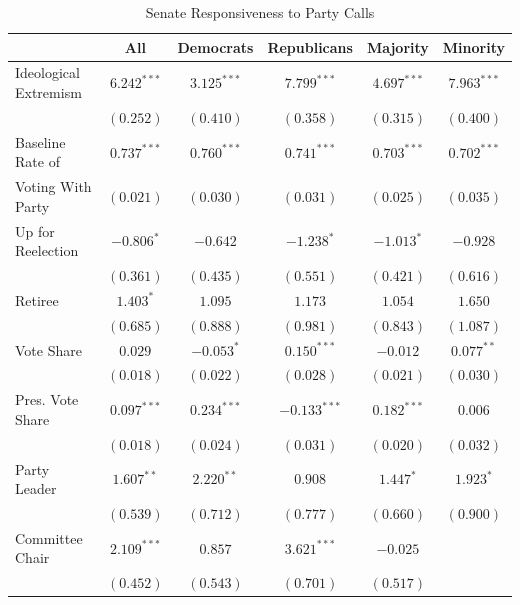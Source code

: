 \documentclass[12pt]{article}
\begin{document}
\begin{table}[H]
\centering
\begin{threeparttable}
\label{tab-senate-models}
\singlespacing
\small
\caption{Senate Responsiveness to Party Calls}
\small
\begin{tabular}{l c c c c c }
\hline
& All & Democrats & Republicans & Majority & Minority \\
\hline
Ideological Extremism & $6.242^{***}$  & $3.125^{***}$ & $7.799^{***}$  & $4.697^{***}$  & $7.963^{***}$ \\
& $(0.252)$      & $(0.410)$     & $(0.358)$      & $(0.315)$      & $(0.400)$     \\
Baseline Rate of               & $0.737^{***}$  & $0.760^{***}$ & $0.741^{***}$  & $0.703^{***}$  & $0.702^{***}$ \\
\hspace{.7em}Voting With Party& $(0.021)$      & $(0.030)$     & $(0.031)$      & $(0.025)$      & $(0.035)$     \\
Up for Reelection    & $-0.806^{*}$   & $-0.642$      & $-1.238^{*}$   & $-1.013^{*}$   & $-0.928$      \\
& $(0.361)$      & $(0.435)$     & $(0.551)$      & $(0.421)$      & $(0.616)$     \\
Retiree                & $1.403^{*}$    & $1.095$       & $1.173$        & $1.054$        & $1.650$       \\
& $(0.685)$      & $(0.888)$     & $(0.981)$      & $(0.843)$      & $(1.087)$     \\
Vote Share            & $0.029$        & $-0.053^{*}$  & $0.150^{***}$  & $-0.012$       & $0.077^{**}$  \\
& $(0.018)$      & $(0.022)$     & $(0.028)$      & $(0.021)$      & $(0.030)$     \\
Pres. Vote Share      & $0.097^{***}$  & $0.234^{***}$ & $-0.133^{***}$ & $0.182^{***}$  & $0.006$       \\
& $(0.018)$      & $(0.024)$     & $(0.031)$      & $(0.020)$      & $(0.032)$     \\
Party Leader                 & $1.607^{**}$   & $2.220^{**}$  & $0.908$        & $1.447^{*}$    & $1.923^{*}$   \\
& $(0.539)$      & $(0.712)$     & $(0.777)$      & $(0.660)$      & $(0.900)$     \\
Committee Chair                  & $2.109^{***}$  & $0.857$       & $3.621^{***}$  & $-0.025$       &               \\
& $(0.452)$      & $(0.543)$     & $(0.701)$      & $(0.517)$      &               \\

\end{tabular}
\end{threeparttable}
\end{table}
\end{document}
